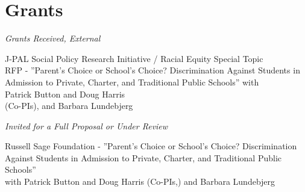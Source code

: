 \documentclass[letterpaper]{article}
\renewenvironment{itemize}{
  \begin{list}{}{
    \setlength{\leftmargin}{1.5em}
  }
}{
  \end{list}
}
\begin{document}
\printbibliography[heading=cvsection, title={Publications},        keyword=published]
\vspace{2 mm}

\printbibliography[heading=cvsection, title={Revise and Resubmit}, keyword=rr]
\vspace{2 mm}

\printbibliography[heading=cvsection, title={Working Papers},      keyword=wp]
\vspace{2 mm}

\printbibliography[heading=cvsection, title={Works in Progress},   keyword=wip]


\section*{Grants}

\vspace{2 mm}
\textit{Grants Received, External} \\
\begin{itemize}
  \item {} {}J-PAL Social Policy Research Initiative / Racial Equity Special Topic \\{\makebox[17mm]{\hfill}} RFP - ”Parent’s Choice or School’s Choice? Discrimination Against Students in \\{\makebox[17mm]{\hfill}} Admission to Private, Charter, and Traditional Public Schools” with \\{\makebox[17mm]{\hfill}} Patrick Button and Doug Harris \\{\makebox[17mm]{\hfill}} (Co-PIs), and Barbara Lundebjerg
\end{itemize}

\textit{Invited for a Full Proposal or Under Review} \\
\begin{itemize}
  \item {} {}Russell Sage Foundation - ”Parent’s Choice or School’s Choice? Discrimination \\{\makebox[17mm]{\hfill}} Against Students in Admission to Private, Charter, and Traditional Public Schools” \\{\makebox[17mm]{\hfill}}  with Patrick Button and Doug Harris (Co-PIs,) and Barbara Lundebjerg
\end{itemize}

\vspace{2 mm}
\end{document}
